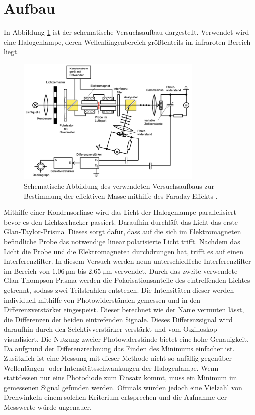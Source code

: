\section{Aufbau}
In Abbildung \ref{fig:schemAufbau} ist der schematische Versuchsaufbau dargestellt. Verwendet wird
eine Halogenlampe, deren Wellenlängenbereich größtenteils im infraroten Bereich liegt.
\begin{figure}[H]
    \centering
    \includegraphics[width=0.8\textwidth]{SchemAufbau.pdf}
    \caption{Schematische Abbildung des verwendeten Versuchsaufbaus zur Bestimmung der effektiven
     Masse mithilfe des Faraday-Effekts \cite{anleitung}.}
    \label{fig:schemAufbau}
\end{figure} \noindent
Mithilfe einer Kondensorlinse wird das Licht der Halogenlampe parallelisiert bevor es den Lichtzerhacker passiert.
Daraufhin durchläft das Licht das erste Glan-Taylor-Prisma. Dieses sorgt dafür, dass auf die sich im
Elektromagneten befindliche Probe das notwendige linear polarisierte Licht trifft. 
Nachdem das Licht die Probe und die Elektromagneten durchdrungen hat, trifft es auf einen Interferenzfilter.
In diesem Versuch werden neun unterschiedliche Interferenzfilter im Bereich von $\SI{1.06}{\micro\meter}$ bis $\SI{2.65}{\micro\meter}$
verwendet. Durch das zweite verwendete Glan-Thompson-Prisma werden die Polarisationsanteile des 
eintreffenden Lichtes getrennt, sodass zwei Teilstrahlen entstehen. Die Intensitäten dieser werden
individuell mithilfe von Photowiderständen gemessen und in den Differenzverstärker eingespeist. Dieser 
berechnet wie der Name vermuten lässt, die Differenzen der beiden eintrefenden Signale. Dieses
Differenzsignal wird daraufhin durch den Selektivverstärker verstärkt und vom Oszilloskop visualisiert. 
Die Nutzung zweier Photowiderstände bietet eine hohe Genauigkeit. Da aufgrund der Differenzrechnung das
Finden des Minimums einfacher ist. Zusätzlich ist eine Messung mit dieser Methode nicht so anfällig
gegenüber Wellenlängen- oder Intensitätsschwankungen der Halogenlampe.
Wenn stattdessen nur eine Photodiode zum Einsatz kommt, muss ein Minimum im gemessenen Signal gefunden 
werden. Oftmals würden jedoch eine Vielzahl von Drehwinkeln einem solchen Kriterium entsprechen 
und die Aufnahme der Messwerte würde ungenauer. 

